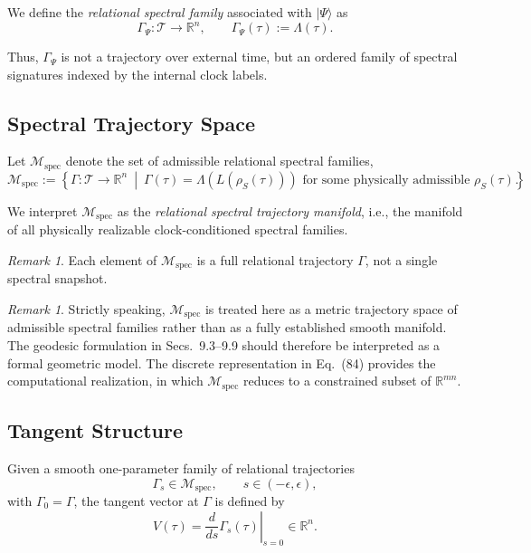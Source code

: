 \documentclass[11pt,a4paper]{article}
\theoremstyle{definition}
\theoremstyle{remark}
\newtheorem{remark}[theorem]{Remark}
\begin{document}
We define the \emph{relational spectral family} associated with $|\Psi\rangle$ as
\begin{equation}
\Gamma_{\Psi} : \mathcal{T} \to \mathbb{R}^n,
\qquad
\Gamma_{\Psi}(\tau) := \Lambda(\tau).
\end{equation}

Thus, $\Gamma_{\Psi}$ is not a trajectory over external time, but an ordered family of spectral signatures indexed by the internal clock labels.

\subsection{Spectral Trajectory Space}

Let $\mathcal{M}_{\mathrm{spec}}$ denote the set of admissible relational spectral families,
\begin{equation}
\mathcal{M}_{\mathrm{spec}}
:=
\left\{
\Gamma : \mathcal{T} \to \mathbb{R}^n
\ \middle|\
\Gamma(\tau) = \Lambda\!\left(L(\rho_S(\tau))\right)
\text{ for some physically admissible } \rho_S(\tau)
\right\}.
\end{equation}

We interpret $\mathcal{M}_{\mathrm{spec}}$ as the \emph{relational spectral trajectory manifold}, i.e., the manifold of all physically realizable clock-conditioned spectral families.

\begin{remark}
Each element of $\mathcal{M}_{\mathrm{spec}}$ is a full relational trajectory $\Gamma$, not a single spectral snapshot.
\end{remark}
\begin{remark}
Strictly speaking, $\mathcal{M}_{\mathrm{spec}}$ is treated here 
as a metric trajectory space of admissible spectral families 
rather than as a fully established smooth manifold. The geodesic 
formulation in Secs.~9.3--9.9 should therefore be interpreted as 
a formal geometric model. The discrete representation in Eq.~(84) 
provides the computational realization, in which 
$\mathcal{M}_{\mathrm{spec}}$ reduces to a constrained subset of 
$\mathbb{R}^{mn}$.
\end{remark}

\subsection{Tangent Structure}

Given a smooth one-parameter family of relational trajectories
\begin{equation}
\Gamma_s \in \mathcal{M}_{\mathrm{spec}}, \qquad s \in (-\epsilon,\epsilon),
\end{equation}
with $\Gamma_0 = \Gamma$, the tangent vector at $\Gamma$ is defined by
\begin{equation}
V(\tau)
=
\left.\frac{d}{ds}\Gamma_s(\tau)\right|_{s=0}
\in \mathbb{R}^n.
\end{equation}
\end{document}
